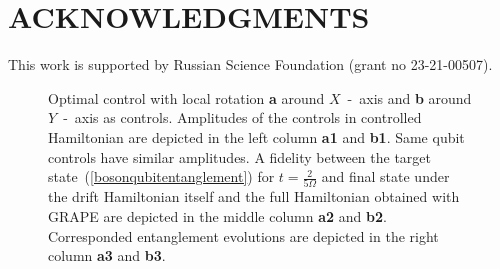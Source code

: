 \documentclass[
aps,%
12pt,%
final,%
notitlepage,%
oneside,%
onecolumn,%
nobibnotes,%
nofootinbib,%
superscriptaddress,%
noshowpacs,%
centertags]%
{revtex4}
\begin{document}
\section{ACKNOWLEDGMENTS}
This work is supported by Russian Science Foundation (grant no 23-21-00507).


% 


\newpage

\begin{figure}[t!]
\setcaptionmargin{5mm}
\onelinecaptionsfalse
{}
\caption{
    Optimal control with local rotation {\bf a} around $X$~-~axis and {\bf b} around $Y$~-~axis as controls. Amplitudes of the controls in controlled Hamiltonian are depicted in the left column {\bf a1} and {\bf b1}. Same qubit controls have similar amplitudes. A fidelity between the target state~(\ref{bosonqubitentanglement}) for $t=\frac{2}{5\Omega}$ and final state under the drift Hamiltonian itself and the full Hamiltonian obtained with GRAPE are depicted in the middle column {\bf a2} and {\bf b2}. Corresponded entanglement evolutions are depicted in the right column {\bf a3} and {\bf b3}.
}
\label{fig2:rotation}
\end{figure}

\newpage
\end{document}
